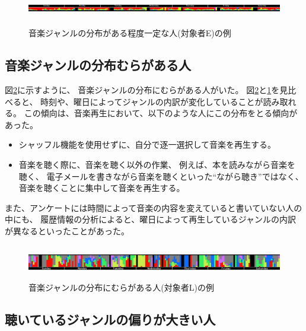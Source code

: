 \documentclass[a4paper, 11pt, onecolumn, report]{jsarticle}
\begin{document}
\begin{figure}[h]
\begin{center}
\includegraphics[width=14cm, height=1.5cm]{genreMap_regular.jpg}
\caption{音楽ジャンルの分布がある程度一定な人(対象者E)の例}
\label{genreMap_regular}
\end{center}
\end{figure}

\subsection{音楽ジャンルの分布むらがある人}
図\ref{genreMap_irregular}に示すように、
音楽ジャンルの分布にむらがある人がいた。
図\ref{genreMap_irregular}と\ref{genreMap_regular}を見比べると、
時刻や、曜日によってジャンルの内訳が変化していることが読み取れる。
この傾向は、音楽再生において、以下のような人にこの分布をとる傾向があった。
\begin{itemize}
\item
シャッフル機能を使用せずに、自分で逐一選択して音楽を再生する。
\item
音楽を聴く際に、音楽を聴く以外の作業、
例えば、本を読みながら音楽を聴く、
電子メールを書きながら音楽を聴くといった``ながら聴き''ではなく、
音楽を聴くことに集中して音楽を再生する。
\end{itemize}
また、アンケートには時間によって音楽の内容を変えていると書いていない人の中にも、
履歴情報の分析によると、曜日によって再生しているジャンルの内訳が異なるといったことがあった。


\begin{figure}[h]
\begin{center}
\includegraphics[width=14cm, height=1.5cm]{genreMap_irregular.jpg}
\caption{音楽ジャンルの分布にむらがある人(対象者L)の例}
\label{genreMap_irregular}
\end{center}
\end{figure}

\subsection{聴いているジャンルの偏りが大きい人}
\end{document}
